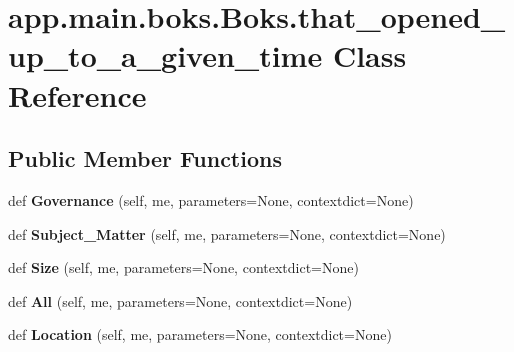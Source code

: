 \hypertarget{classapp_1_1main_1_1boks_1_1Boks_1_1that__opened__up__to__a__given__time}{}\section{app.\+main.\+boks.\+Boks.\+that\+\_\+opened\+\_\+up\+\_\+to\+\_\+a\+\_\+given\+\_\+time Class Reference}
\label{classapp_1_1main_1_1boks_1_1Boks_1_1that__opened__up__to__a__given__time}
\subsection*{Public Member Functions}
\begin{DoxyCompactItemize}
\item 
\mbox{\label{classapp_1_1main_1_1boks_1_1Boks_1_1that__opened__up__to__a__given__time_a5b61ca45cdc459a9e8ffa1bb5213df69}} 
def {\bfseries Governance} (self, me, parameters=None, contextdict=None)
\item 
\mbox{\label{classapp_1_1main_1_1boks_1_1Boks_1_1that__opened__up__to__a__given__time_ab0648859c120a48267a68a81a67fc949}} 
def {\bfseries Subject\+\_\+\+Matter} (self, me, parameters=None, contextdict=None)
\item 
\mbox{\label{classapp_1_1main_1_1boks_1_1Boks_1_1that__opened__up__to__a__given__time_a384136b8eb57c2381290604a7b145872}} 
def {\bfseries Size} (self, me, parameters=None, contextdict=None)
\item 
\mbox{\label{classapp_1_1main_1_1boks_1_1Boks_1_1that__opened__up__to__a__given__time_afa594c5a19211b0639fd3dd680f73b34}} 
def {\bfseries All} (self, me, parameters=None, contextdict=None)
\item 
\mbox{\label{classapp_1_1main_1_1boks_1_1Boks_1_1that__opened__up__to__a__given__time_a9eb6512a8ed1e416b6b8f5bb34fabfdc}} 
def {\bfseries Location} (self, me, parameters=None, contextdict=None)
\end{DoxyCompactItemize}
